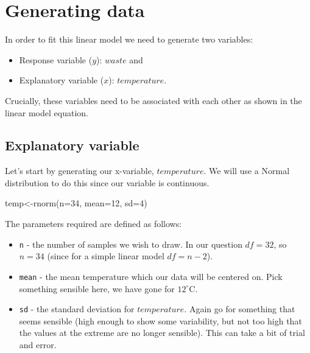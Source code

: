 \documentclass[
]{book}
\newenvironment{Shaded}{\begin{snugshade}}{\end{snugshade}}
\newcommand{\AttributeTok}[1]{\textcolor[rgb]{0.77,0.63,0.00}{#1}}
\newcommand{\DecValTok}[1]{\textcolor[rgb]{0.00,0.00,0.81}{#1}}
\newcommand{\FunctionTok}[1]{\textcolor[rgb]{0.00,0.00,0.00}{#1}}
\newcommand{\NormalTok}[1]{#1}
\newcommand{\OtherTok}[1]{\textcolor[rgb]{0.56,0.35,0.01}{#1}}
\providecommand{\tightlist}{%
  \setlength{\itemsep}{0pt}\setlength{\parskip}{0pt}}
\begin{document}
\hypertarget{generating-data}{%
\section{Generating data}\label{generating-data}}

In order to fit this linear model we need to generate two variables:

\begin{itemize}
\tightlist
\item
  Response variable (\(y\)): \(waste\) and
\item
  Explanatory variable (\(x\)): \(temperature\).
\end{itemize}

Crucially, these variables need to be associated with each other as shown in the linear model equation.

\hypertarget{explanatory-variable}{%
\subsection{Explanatory variable}\label{explanatory-variable}}

Let's start by generating our x-variable, \(temperature\). We will use a Normal distribution to do this since our variable is continuous.

\begin{Shaded}
\begin{Highlighting}[]
\NormalTok{temp}\OtherTok{\textless{}{-}}\FunctionTok{rnorm}\NormalTok{(}\AttributeTok{n=}\DecValTok{34}\NormalTok{, }\AttributeTok{mean=}\DecValTok{12}\NormalTok{, }\AttributeTok{sd=}\DecValTok{4}\NormalTok{)}
\end{Highlighting}
\end{Shaded}

The parameters required are defined as follows:

\begin{itemize}
\tightlist
\item
  \texttt{n} - the number of samples we wish to draw. In our question \(df=32\), so \(n=34\) (since for a simple linear model \(df=n-2\)).
\item
  \texttt{mean} - the mean temperature which our data will be centered on. Pick something sensible here, we have gone for \(12^{\circ}\)C.
\item
  \texttt{sd} - the standard deviation for \(temperature\). Again go for something that seems sensible (high enough to show some variability, but not too high that the values at the extreme are no longer sensible). This can take a bit of trial and error.
\end{itemize}
\end{document}

